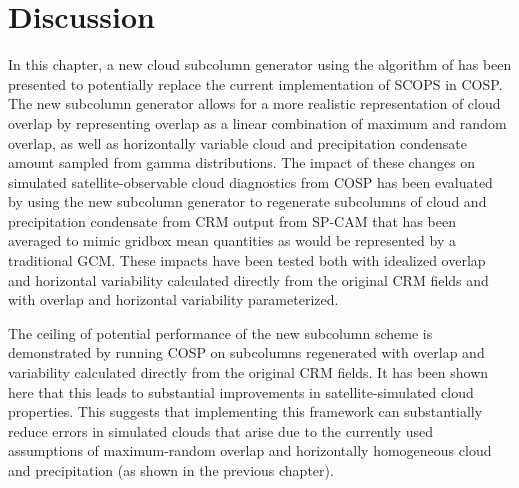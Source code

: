 \section{Discussion}\label{sec:subgrid2Discussion}

In this chapter, a new cloud subcolumn generator using the algorithm of
\citet{raisanen_et_al_2004} has been presented to potentially replace
the current implementation of SCOPS in COSP. The new subcolumn generator
allows for a more realistic representation of cloud overlap by
representing overlap as a linear combination of maximum and random
overlap, as well as horizontally variable cloud and precipitation
condensate amount sampled from gamma distributions. The impact of these
changes on simulated satellite-observable cloud diagnostics from COSP
has been evaluated by using the new subcolumn generator to regenerate
subcolumns of cloud and precipitation condensate from CRM output from
SP-CAM that has been averaged to mimic gridbox mean quantities as would
be represented by a traditional GCM. These impacts have been tested both
with idealized overlap and horizontal variability calculated directly
from the original CRM fields and with overlap and horizontal variability
parameterized.

The ceiling of potential performance of the new subcolumn scheme is
demonstrated by running COSP on subcolumns regenerated with overlap and
variability calculated directly from the original CRM fields. It has
been shown here that this leads to substantial improvements in
satellite-simulated cloud properties. This suggests that implementing
this framework can substantially reduce errors in simulated clouds that
arise due to the currently used assumptions of maximum-random overlap
and horizontally homogeneous cloud and precipitation (as shown in the
previous chapter).

